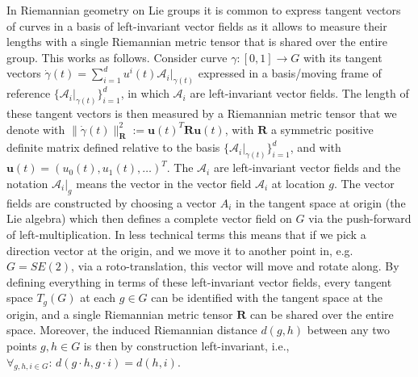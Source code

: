 \documentclass{article}
\begin{document}
In Riemannian geometry on Lie groups it is common to express tangent vectors of curves in a basis of left-invariant vector fields as it allows to measure their lengths with a single Riemannian metric tensor that is shared over the entire group. This works as follows. Consider curve $\gamma:[0,1]\rightarrow G$ with its tangent vectors $\dot{\gamma}(t) = \sum_{i=1}^d u^i(t) \mathcal{A}_i|_{\gamma(t)}$ expressed in a basis/moving frame of reference $\{\mathcal{A}_i|_{\gamma(t)}\}_{i=1}^d$, in which $\mathcal{A}_i$ are left-invariant vector fields. The length of these tangent vectors is then measured by a Riemannian metric tensor that we denote with $\lVert \dot{\gamma}(t) \rVert_{\mathbf{R}}^2 := \mathbf{u}(t)^T \mathbf{R} \mathbf{u}(t)$, with $\mathbf{R}$ a symmetric positive definite matrix defined relative to the basis $\{\mathcal{A}_i|_{\gamma(t)}\}_{i=1}^d$, and with $\mathbf{u}(t) = (u_0(t), u_1(t), \dots )^T$. The $\mathcal{A}_i$ are left-invariant vector fields and the notation $\mathcal{A}_i|_{g}$ means the vector in the vector field $\mathcal{A}_i$ at location $g$. The vector fields are constructed by choosing a vector $A_i$ in the tangent space at origin (the Lie algebra) which then defines a complete vector field on $G$ via the push-forward of left-multiplication. In less technical terms this means that if we pick a direction vector at the origin, and we move it to another point in, e.g. $G=SE(2)$, via a roto-translation, this vector will move and rotate along. By defining everything in terms of these left-invariant vector fields, every tangent space $T_g(G)$ at each $g \in G$ can be identified with the tangent space at the origin, and a single Riemannian metric tensor $\mathbf{R}$ can be shared over the entire space. Moreover, the induced Riemannian distance $d(g,h)$ between any two points $g,h \in G$ is then by construction left-invariant, i.e., $\forall_{g,h,i \in G}:\, d(g \cdot h, g \cdot i) = d(h,i)$.
\end{document}
